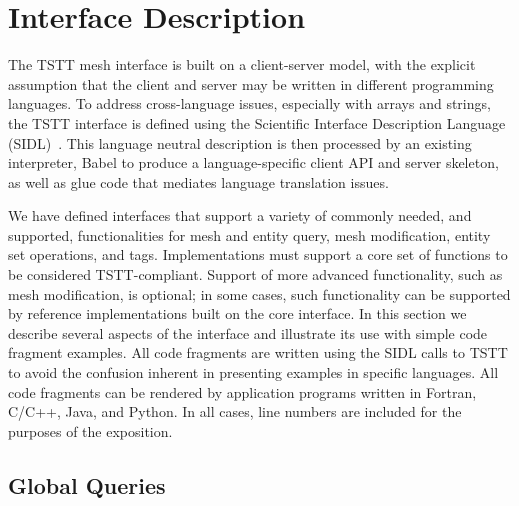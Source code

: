 
\section{Interface Description\label{sec:Interface}}

The TSTT mesh interface is built on a client-server model, with the
explicit assumption that the client and server may be written in
different programming languages.  To address cross-language issues,
especially with arrays and strings, the TSTT interface is defined using
the Scientific Interface Description Language
(SIDL)~\cite{babel:site04,usersguide04}.  This language neutral
description is then processed by an existing interpreter, Babel to
produce a language-specific client API and server skeleton, as well as
glue code that mediates language translation issues.

We have defined interfaces that support a variety of commonly needed,
and supported, functionalities for mesh and entity query, mesh
modification, entity set operations, and tags.  Implementations must
support a core set of functions to be considered TSTT-compliant.
Support of more advanced functionality, such as mesh modification, is
optional; in some cases, such functionality can be supported by
reference implementations built on the core interface.  In this section
we describe several aspects of the interface and illustrate its use with
simple code fragment examples.  All code fragments are written using the
SIDL calls to TSTT to avoid the confusion inherent in presenting
examples in specific languages.  All code fragments can be rendered by
application programs written in Fortran, C/C++, Java, and Python. In all
cases, line numbers are included for the purposes of the exposition.

\subsection{Global Queries\label{sub:Mesh-Interface}}

